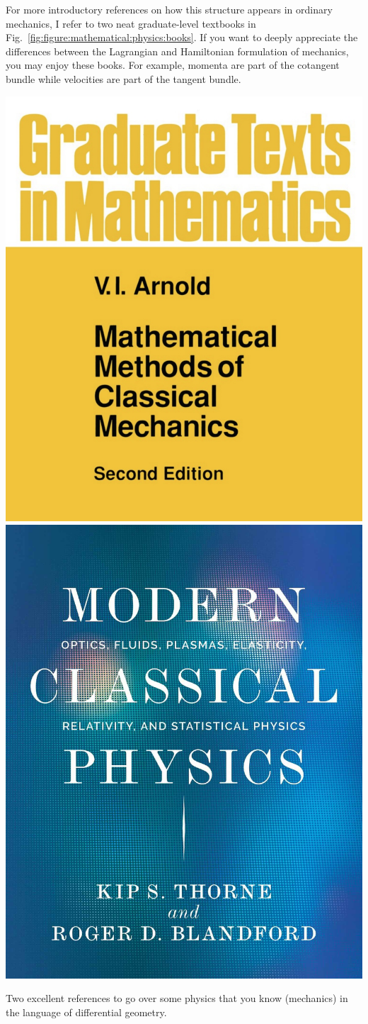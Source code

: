\documentclass[12pt, oneside]{report}    %
\begin{document}
For more introductory references on how this structure appears in ordinary mechanics, I refer to two neat graduate-level textbooks in Fig.~\ref{fig:figure:mathematical:physics:books}. If you want to deeply appreciate the differences between the Lagrangian and Hamiltonian formulation of mechanics, you may enjoy these books. For example, momenta are part of the cotangent bundle while velocities are part of the tangent bundle. 
\begin{marginfigure}%
    \includegraphics[width=.6\textwidth]{figures/Arnoldbook.jpg}\\
    \includegraphics[width=.6\textwidth]{figures/MCP_Thorne.jpg}
    \caption{Two excellent references to go over some physics that you know (mechanics) in the language of differential geometry.}
    \label{fig:figure:mathematical:physics:books}
\end{marginfigure}
\end{document}
